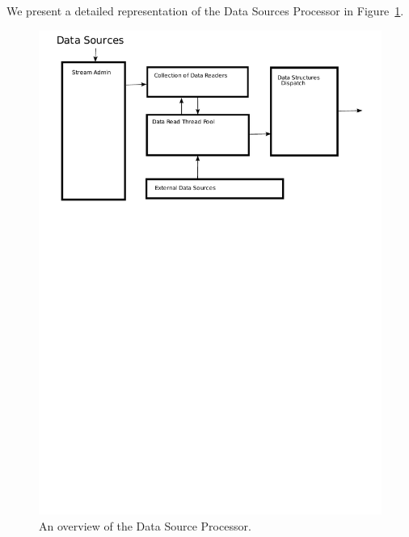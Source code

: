 \documentclass[14pt]{article}
\newcommand{\comment}[1]{}
\begin{document}
\noindent We present a detailed representation of the Data Sources Processor in
Figure~\ref{fig:data-source-proc}.

\comment{
where each thread picks a Data Reader and executes a read at a time from one of
them. Once read is done the results of the read are forwarded to a Data
Structure Dispatch. The Dispatch uses the appropriate Data Adapter to handle the
data into a structured format, then the structured data is forwarded to Query
Processor, in particular to the Query Tuple Queue. The more pictorial
description can be found in figure \ref{fig:data-source-proc}.
}

\comment{
processing consists of the list of list of stream points. Each point is given by
the user and signifies a way for a DBToaster to connect with the input stream of
some process which dispatches data to the DBToaster. Each Stream Point is
written by the user and user can fully specify how the data should be received
and processed. Stream point is responsible for sending data to the Data Dispatch
unite in a pre-specified format. The structure for data source processing can be
found in figure
}

\begin{figure}
  \includegraphics[width=5.00in]{figures/DataSources.pdf}
  \caption{An overview of the Data Source Processor.}
  \label{fig:data-source-proc}
\end{figure}
\end{document}
